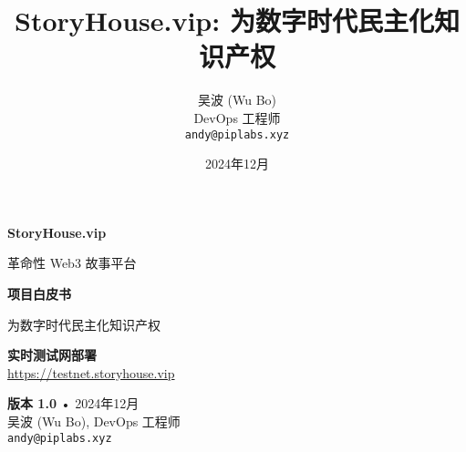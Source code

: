 \documentclass[12pt,a4paper]{article}
\title{StoryHouse.vip: 为数字时代民主化知识产权}
\author{吴波 (Wu Bo) \\ DevOps 工程师 \\ \texttt{andy@piplabs.xyz}}
\date{2024年12月}
\begin{document}
\begin{titlepage}
    \centering
    \vspace*{2cm}
    
    \textcolor{storyblue}{\Huge \textbf{StoryHouse.vip}}
    
    \vspace{1cm}
    \textcolor{storygray}{\Large 革命性 Web3 故事平台}
    
    \vspace{2cm}
    {\huge \textbf{项目白皮书}}
    
    \vspace{0.5cm}
    {\Large \textcolor{storygray}{为数字时代民主化知识产权}}
    
    \vspace{2cm}
    
    \begin{center}
    \end{center}
    
    \vspace{2cm}
    
    \begin{center}
    \textcolor{storygreen}{\textbf{实时测试网部署}}\\
    \textcolor{storygray}{\url{https://testnet.storyhouse.vip}}
    \end{center}
    
    \vfill
    
    \begin{center}
    \textcolor{storygray}{
        \textbf{版本 1.0} • 2024年12月 \\
        吴波 (Wu Bo), DevOps 工程师 \\
        \texttt{andy@piplabs.xyz}
    }
    \end{center}
    
    \vspace{1cm}
\end{titlepage}
\end{document}
